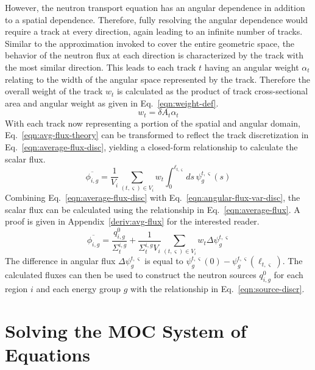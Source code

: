 However, the neutron transport equation has an angular dependence in addition to a spatial dependence. Therefore, fully resolving the angular dependence would require a track at every direction, again leading to an infinite number of tracks. Similar to the approximation invoked to cover the entire geometric space, the behavior of the neutron flux at each direction is characterized by the track with the most similar direction. This leads to each track $t$ having an angular weight $\alpha_t$ relating to the width of the angular space represented by the track. Therefore the overall weight of the track $w_t$ is calculated as the product of track cross-sectional area and angular weight as given in Eq.~\ref{eqn:weight-def}.
\begin{equation}
w_{t} = \delta A_{t} \alpha_t
\label{eqn:weight-def}
\end{equation}
With each track now representing a portion of the spatial and angular domain, Eq.~\ref{eqn:avg-flux-theory} can be transformed to reflect the track discretization in Eq.~\ref{eqn:average-flux-disc}, yielding a closed-form relationship to calculate the scalar flux.
\begin{dmath}
	\overline{\phi_{i,g}} = \frac{1}{V_i} \sum_{(t,\varsigma) \in V_i} w_{t} \int_{0}^{\ell_{t,\varsigma}} ds \, \psi^{t,\varsigma}_g(s)
	\label{eqn:average-flux-disc}
\end{dmath}
Combining Eq.~\ref{eqn:average-flux-disc} with Eq.~\ref{eqn:angular-flux-var-disc}, the scalar flux can be calculated using the relationship in Eq.~\ref{eqn:average-flux}. A proof is given in Appendix~\ref{deriv:avg-flux} for the interested reader.
\begin{dmath}
	\overline{\phi_{i,g}} = \frac{q^0_{i,g}}{\Sigma_{t}^{i,g}} + \frac{1}{\Sigma_{t}^{i,g} V_i} \sum_{(t,\varsigma) \in V_i} w_{t} \Delta \psi_g^{t,\varsigma}
	\label{eqn:average-flux}
\end{dmath}
The difference in angular flux $\Delta \psi_g^{t,\varsigma}$ is equal to $\psi_g^{t,\varsigma}(0) - \psi_g^{t,\varsigma}(\ell_{t,\varsigma})$. The calculated fluxes can then be used to construct the neutron sources $q^0_{i,g}$ for each region $i$ and each energy group $g$ with the relationship in Eq.~\ref{eqn:source-discr}.


\section{Solving the MOC System of Equations}
\label{sec:moc-solve}

